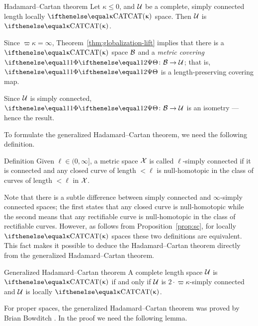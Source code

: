 \begin{thm}{Hadamard--Cartan theorem}
\label{thm:hadamard-cartan}
Let $\kappa\le 0$, and $\mathcal{U}$ be a complete, simply connected length locally $\CAT\kappa$ space.
Then $\mathcal{U}$ is $\CAT\kappa$.
\end{thm}

 Since $\varpi\kappa=\infty$, Theorem~\ref{thm:globalization-lift} implies that there is a $\CAT\kappa$ space $\mathcal{B}$ and a \emph{metric covering} $\map\:\spc{B}\to\spc{U}$; that is, $\map$ is a length-preserving covering map. 

Since $\mathcal{U}$ is simply connected, $\map\:\spc{B}\to\spc{U}$ is an isometry --- hence the result.
\qeds

To formulate the generalized Hadamard--Cartan theorem,
we need the following definition.

\begin{thm}{Definition}\label{def:l-s.c.}
Given $\ell\in (0,\infty]$,
a metric space $\mathcal{X}$ is called 
$\ell$-simply connected 
if it is connected and 
any closed curve of length $<\ell$ 
is null-homotopic in the class of curves of length $<\ell$ in $\mathcal{X}$.
\end{thm}

Note that there is a subtle difference between 
simply connected and $\infty$-simply connected spaces;
the first states that any closed curve is null-homotopic while the second means that any rectifiable curve is null-homotopic in the class of rectifiable curves.
However, as follows from Proposition~\ref{prop:sc}, for locally $\CAT\kappa$ spaces these two definitions are equivalent.
This fact makes it possible to deduce the Hadamard--Cartan theorem directly from the generalized Hadamard--Cartan theorem.

\begin{thm}{Generalized Hadamard--Cartan theorem}\label{thm:hadamard-cartan-gen}
A complete length space
$\mathcal{U}$ is $\CAT\kappa$ 
if and only if $\mathcal{U}$ is $2\cdot\varpi\kappa$-simply connected
and $\mathcal{U}$ is locally $\CAT\kappa$.
\end{thm}

For proper spaces, the generalized Hadamard--Cartan theorem was proved by Brian Bowditch \cite{bowditch}.
In the proof we need the following lemma.

